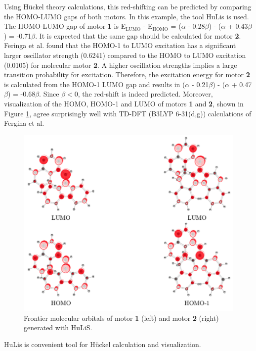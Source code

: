 \documentclass{article}
\begin{document}
Using H\"uckel theory calculations, this red-shifting can be predicted by comparing the HOMO-LUMO gaps of both motors. In this example, the tool HuLis is used.\cite{Carissan2008, hulis} The HOMO-LUMO gap of motor \textbf{1} is E$_\text{LUMO}$ - E$_\text{HOMO}$ = ($\alpha$ - 0.28$\beta$) - ($\alpha$ + 0.43$\beta$) = -0.71$\beta$. It is expected that the same gap should be calculated for motor \textbf{2}. Feringa et al. found that the HOMO-1 to LUMO excitation has a significant larger oscillator strength (0.6241) compared to the HOMO to LUMO excitation (0.0105) for molecular motor \textbf{2}. A higher oscillation strengths implies a large transition probability for excitation. Therefore, the excitation energy for motor \textbf{2} is calculated from the HOMO-1 LUMO gap and results in ($\alpha$ - 0.21$\beta$) - ($\alpha$ + 0.47$\beta$) = -0.68$\beta$. Since $\beta {<} 0$, the red-shift is indeed predicted. Moreover, visualization of the HOMO, HOMO-1 and LUMO of motors \textbf{1} and \textbf{2}, shown in Figure \ref{fig:hulis_orbitals}, agree surprisingly well with TD-DFT (B3LYP 6-31(d,g)) calculations of Fergina et al.

\begin{figure}[h]
\centering
\includegraphics[scale=0.75]{./images/hulis_mm.png}
\caption{Frontier molecular orbitals of motor \textbf{1} (left) and motor \textbf{2} (right) generated with HuLiS.}
\label{fig:hulis_orbitals}
\end{figure} 

HuLis is convenient tool for H\"uckel calculation and visualization. 
\end{document}
